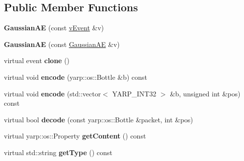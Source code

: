 \subsection*{Public Member Functions}
\begin{DoxyCompactItemize}
\item 
{\bfseries Gaussian\+AE} (const \hyperlink{classev_1_1vEvent}{v\+Event} \&v)\hypertarget{classev_1_1GaussianAE_abc9c34d68ad44ea743b565a6206e591f}{}\label{classev_1_1GaussianAE_abc9c34d68ad44ea743b565a6206e591f}

\item 
{\bfseries Gaussian\+AE} (const \hyperlink{classev_1_1GaussianAE}{Gaussian\+AE} \&v)\hypertarget{classev_1_1GaussianAE_ac5934905f00cc08eb9c444f67e0ec6a2}{}\label{classev_1_1GaussianAE_ac5934905f00cc08eb9c444f67e0ec6a2}

\item 
virtual event {\bfseries clone} ()\hypertarget{classev_1_1GaussianAE_aa9e649d9039d3e9348cea99352df77c5}{}\label{classev_1_1GaussianAE_aa9e649d9039d3e9348cea99352df77c5}

\item 
virtual void {\bfseries encode} (yarp\+::os\+::\+Bottle \&b) const \hypertarget{classev_1_1GaussianAE_a305a85a18095be68f6ccef59bc1ee9a7}{}\label{classev_1_1GaussianAE_a305a85a18095be68f6ccef59bc1ee9a7}

\item 
virtual void {\bfseries encode} (std\+::vector$<$ Y\+A\+R\+P\+\_\+\+I\+N\+T32 $>$ \&b, unsigned int \&pos) const \hypertarget{classev_1_1GaussianAE_aea6d039dbc83566a9f59ce9dab929ee5}{}\label{classev_1_1GaussianAE_aea6d039dbc83566a9f59ce9dab929ee5}

\item 
virtual bool {\bfseries decode} (const yarp\+::os\+::\+Bottle \&packet, int \&pos)\hypertarget{classev_1_1GaussianAE_a7d673491b6b6e243d44131527c0ded39}{}\label{classev_1_1GaussianAE_a7d673491b6b6e243d44131527c0ded39}

\item 
virtual yarp\+::os\+::\+Property {\bfseries get\+Content} () const \hypertarget{classev_1_1GaussianAE_a986a28cb312c870c8e7fc1bc178a8a5a}{}\label{classev_1_1GaussianAE_a986a28cb312c870c8e7fc1bc178a8a5a}

\item 
virtual std\+::string {\bfseries get\+Type} () const \hypertarget{classev_1_1GaussianAE_a902ce886c1c5a2af42e073c3c7992bd5}{}\label{classev_1_1GaussianAE_a902ce886c1c5a2af42e073c3c7992bd5}

\end{DoxyCompactItemize}
